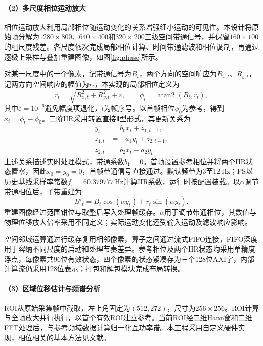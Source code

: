 \paragraph{（2）多尺度相位运动放大}
相位运动放大利用局部相位随运动变化的关系增强细小运动的可见性\cite{wadhwa2013}。本设计将原始帧分解为$1280\times800$、$640\times400$和$320\times200$三级空间带通信号，并保留$160\times100$的粗尺度残差。各尺度依次完成局部相位计算、时间带通滤波和相位调制，再通过逐级上采样与叠加重建图像，如图\ref{fig:phase}所示。


对某一尺度中的一个像素，记带通信号为$B_t$，两个方向的空间响应为$R_{x,t}$、$R_{y,t}$，记两方向空间响应的幅值为$r_t$，本实现的局部相位定义为
\begin{equation}
 r_t=\sqrt{R_{x,t}^{2}+R_{y,t}^{2}}+\varepsilon,
 \qquad \phi_t=\operatorname{atan2}(B_t,r_t),
 \label{eq:local-phase}
\end{equation}
其中$\varepsilon=10^{-6}$避免幅度项退化，$t$为帧序号。以首帧相位$\phi_0$为参考，得到$x_t=\phi_t-\phi_0$。二阶IIR采用转置直接Ⅱ型形式，其更新关系为
\begin{equation}
\begin{aligned}
 y_t&=b_0x_t+z_{1,t-1},\\
 z_{1,t}&=-a_1y_t+z_{2,t-1},\\
 z_{2,t}&=b_2x_t-a_2y_t.
\end{aligned}
\label{eq:iir}
\end{equation}
上述关系描述实时处理模式，带通系数$b_1=0$。首帧设置参考相位并将两个IIR状态置零，因此$x_0=y_0=0$，首帧带通信号直接通过。默认频带为3至12\,Hz；PS以历史基线采样率常数$f_s=60.379777$\,Hz计算IIR系数，运行时按配置装载。以$\alpha$调节带通相位后，子带重建为
\begin{equation}
 B'_t=B_t\cos(\alpha y_t)+r_t\sin(\alpha y_t).
 \label{eq:band-reconstruction}
\end{equation}
重建图像经过范围钳位与取整后写入处理帧缓存。$\alpha$用于调节带通相位，其数值与物理位移放大倍率采用不同定义；实际运动变化还受输入运动及滤波响应影响。

空间邻域运算通过行缓存复用相邻像素，算子之间通过流式FIFO连接，FIFO深度用于容纳不同尺度的启动和处理节奏差异。参考相位及两个IIR状态均采用单精度浮点，每像素共96位有效状态，四个像素的状态紧凑存为三个128位AXI字，内部计算流仍采用128位表示；打包和解包模块完成布局转换。

\paragraph{（3）区域位移估计与频谱分析}
ROI从原始采集帧中截取，左上角固定为$(512,272)$，尺寸为$256\times256$。ROI计算与全帧放大并行执行，以首个有效ROI建立参考。当前ROI经二维Hann窗和二维FFT处理后，与参考频域数据计算归一化互功率谱。本工程采用自定义硬件实现，相位相关的基本方法见文献\cite{opencvphase}。

